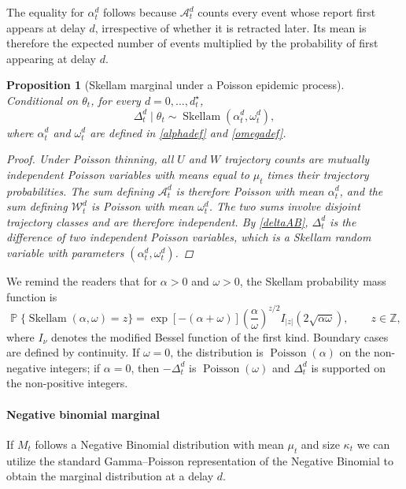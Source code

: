 \documentclass{article}
\newtheorem{proposition}{Proposition}
\theoremstyle{definition}
\theoremstyle{remark}
\newcommand{\Pois}{\operatorname{Poisson}}
\newcommand{\Sk}{\operatorname{Skellam}}
\newcommand{\Prb}{\operatorname{\mathbb{P}}}
\begin{document}
The equality for $\alpha_t^d$ follows because $\mathcal A_t^d$ counts every
event whose report first appears at delay $d$, irrespective of whether it is
retracted later. Its mean is therefore the expected number of events multiplied
by the probability of first appearing at delay $d$.


\begin{proposition}[Skellam marginal under a Poisson epidemic process]\label{prop:poissonskellam}
Conditional on $\theta_t$, for every $d=0,\dots,d_t^{\star}$,
\begin{equation}\label{poissonskellam}
    \Delta_t^d\mid\theta_t
    \sim
    \Sk(\alpha_t^d,\omega_t^d),
\end{equation}
where $\alpha_t^d$ and $\omega_t^d$ are defined in \eqref{alphadef} and \eqref{omegadef}. 
\begin{proof}
Under Poisson thinning, all $U$ and $W$ trajectory counts are mutually independent Poisson variables with means equal to $\mu_t$ times their trajectory probabilities. The sum defining $\mathcal A_t^d$ is therefore Poisson with mean $\alpha_t^d$, and the sum defining $\mathcal W_t^d$ is Poisson with mean $\omega_t^d$. The two sums involve disjoint trajectory classes and are therefore independent. By \eqref{deltaAB}, $\Delta_t^d$ is the difference of two independent Poisson variables, which is a Skellam random variable with parameters $(\alpha_t^d,\omega_t^d)$. 
\end{proof}
\end{proposition}

We remind the readers that for $\alpha>0$ and $\omega>0$, the Skellam probability mass function is
\begin{equation}\label{skellampmf}
    \Prb\{\Sk(\alpha,\omega)=z\}
    =
    \exp[-(\alpha+\omega)]
    \left(\frac{\alpha}{\omega}\right)^{z/2}
    I_{|z|}\left(2\sqrt{\alpha\omega}\right),
    \qquad z\in\mathbb Z,
\end{equation}
where $I_\nu$ denotes the modified Bessel function of the first kind. Boundary cases are defined by continuity. If $\omega=0$, the distribution is $\Pois(\alpha)$ on the non-negative integers; if $\alpha=0$, then $-\Delta_t^d$ is $\Pois(\omega)$ and $\Delta_t^d$ is supported on the non-positive integers.



\paragraph{Negative binomial marginal} If $M_t$ follows a Negative Binomial distribution with mean $\mu_t$ and size $\kappa_t$ we can utilize the standard Gamma--Poisson representation of the Negative Binomial to obtain the marginal distribution at a delay $d$. 
\end{document}
